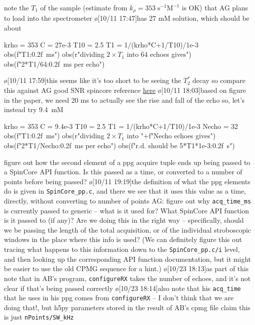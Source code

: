 note the $T_1$ of the sample (estimate from $k_{\rho}=353\;\text{s}^{-1}\text{M}^{-1}$ is OK) that AG plans to load into the spectrometer
\o[10/11 17:47]{has 27 mM solution, which should be about}
\begin{python}
krho = 353
C = 27e-3
T10 = 2.5
T1 = 1/(krho*C+1/T10)/1e-3
obs(f"{T1:0.2f}~ms")
obs(r"dividing $2\times T_1$ into 64 echoes gives")
obs(f"{2*T1/64:0.2f}~ms per echo")
\end{python}
\o[10/11 17:59]{this seems like it's too short to be seeing the $T_2^*$ decay}
so compare this against AG good SNR spincore reference \href{https://jmfrancklab.slack.com/archives/CLMMYDD98/p1679057089427599}{here}
\o[10/11 18:03]{based on figure in the paper, we need 20 ms to actually see the rise and fall of the echo}
so, let's instead try 9.4~mM
\begin{python}
krho = 353
C = 9.4e-3
T10 = 2.5
T1 = 1/(krho*C+1/T10)/1e-3
Necho = 32 
obs(f"{T1:0.2f}~ms")
obs(r"dividing $2\times T_1$ into "+f"{Necho} echoes gives")
obs(f"{2*T1/Necho:0.2f}~ms per echo")
obs(f"r.d. should be {5*T1*1e-3:0.2f}~s")
\end{python}
figure out how the second element of a ppg acquire tuple ends up being passed to a SpinCore API function.  Is this passed as a time, or converted to a number of points before being passed?
\o[10/11 19:19]{the definition of what the ppg elements do is given in \texttt{SpinCore_pp.c}, and there we see that it uses this value as a time, directly, without converting to number of points}
AG: figure out why \texttt{acq_time_ms} is currently passed to generic -- what is it used for? What SpinCore API function is it passed to (if any)? Are we doing this in the right way -- specifically, should we be passing the length of the total acquisition, or of the individual stroboscopic windows in the place where this info is used? (We can definitely figure this out tracing what happens to this information down to the \texttt{SpinCore_pp.c/i} level, and then looking up the corresponding API function documentation, but it might be easier to use the old CPMG sequence for a hint.)
\o[10/23 18:13]{as part of this note that in AB's program, \texttt{configureRX} takes the number of echoes, and it's not clear if that's being passed correctly}
\o[10/23 18:14]{also note that his \texttt{acq_time} that he uses in his ppg comes from \texttt{configureRX} -- I don't think that we are doing that!, but h5py parameters stored in the result of AB's cpmg file claim this is just \texttt{nPoints/SW_kHz}}


